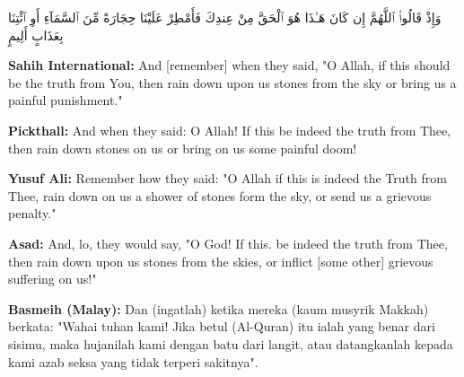 \documentclass[11pt,a4paper,openany]{book}
\let\textAR\textarabic
\newcommand{\quranverse}[1]{{\centering\Large\textAR{#1}\par}}
\begin{document}
\begin{quranbox}[Qur'an 8:32]
\quranverse{وَإِذْ قَالُوا۟ ٱللَّهُمَّ إِن كَانَ هَـٰذَا هُوَ ٱلْحَقَّ مِنْ عِندِكَ فَأَمْطِرْ عَلَيْنَا حِجَارَةً مِّنَ ٱلسَّمَآءِ أَوِ ٱئْتِنَا بِعَذَابٍ أَلِيمٍ}

\vspace{6pt}
\noindent\textbf{Sahih International:} And [remember] when they said, "O Allah, if this should be the truth from You, then rain down upon us stones from the sky or bring us a painful punishment."

\vspace{4pt}
\noindent\textbf{Pickthall:} And when they said: O Allah! If this be indeed the truth from Thee, then rain down stones on us or bring on us some painful doom!

\vspace{4pt}
\noindent\textbf{Yusuf Ali:} Remember how they said: "O Allah if this is indeed the Truth from Thee, rain down on us a shower of stones form the sky, or send us a grievous penalty."

\vspace{4pt}
\noindent\textbf{Asad:} And, lo, they would say, "O God! If this. be indeed the truth from Thee, then rain down upon us stones from the skies, or inflict [some other] grievous suffering on us!"

\vspace{4pt}
\noindent\textbf{Basmeih (Malay):} Dan (ingatlah) ketika mereka (kaum musyrik Makkah) berkata: "Wahai tuhan kami! Jika betul (Al-Quran) itu ialah yang benar dari sisimu, maka hujanilah kami dengan batu dari langit, atau datangkanlah kepada kami azab seksa yang tidak terperi sakitnya".
\end{quranbox}
\end{document}

